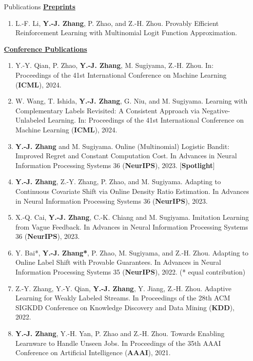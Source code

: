 \documentclass{resume} %
\begin{document}
\begin{rSection}{Publications}
\noindent \underline{\textbf{Preprints}}
\begin{enumerate}[leftmargin=*]
\item L.-F. Li, \textbf{Y.-J. Zhang}, P. Zhao, and Z.-H. Zhou. Provably Efficient Reinforcement Learning with Multinomial Logit Function Approximation. 
\end{enumerate}
\noindent \underline{\textbf{Conference Publications}}
\begin{enumerate}[leftmargin=*]
	\item Y.-Y. Qian, P. Zhao, \textbf{Y.-J. Zhang}, M. Sugiyama, Z.-H. Zhou. In: Proceedings of the 41st International Conference on Machine Learning (\textbf{ICML}), 2024.
	\item W. Wang, T. Ishida, \textbf{Y.-J. Zhang}, G. Niu, and M. Sugiyama. Learning with Complementary Labels Revisited: A Consistent Approach via Negative-Unlabeled Learning. In: Proceedings of the 41st International Conference on Machine Learning (\textbf{ICML}), 2024.		 
	\item \textbf{Y.-J. Zhang} and M. Sugiyama. Online (Multinomial) Logistic Bandit: Improved Regret and Constant Computation Cost. In {Advances in Neural Information Processing Systems 36} (\textbf{NeurIPS}), 2023. [\textbf{Spotlight}]
	\item \textbf{Y.-J. Zhang}, Z.-Y. Zhang, P. Zhao, and M. Sugiyama. Adapting to Continuous Covariate Shift via Online Density Ratio Estimation. In {Advances in Neural Information Processing Systems 36} (\textbf{NeurIPS}), 2023.
	\item X.-Q. Cai, \textbf{Y.-J. Zhang}, C.-K. Chiang and M. Sugiyama. Imitation Learning from Vague Feedback. In {Advances in Neural Information Processing Systems 36} (\textbf{NeurIPS}), 2023.
	\item Y. Bai*, \textbf{Y.-J. Zhang*}, P. Zhao, M. Sugiyama, and Z.-H. Zhou. Adapting to Online Label Shift with Provable Guarantees. In {Advances in Neural Information Processing Systems 35} (\textbf{NeurIPS}), 2022.  (* equal contribution)
	\item Z.-Y. Zhang, Y.-Y. Qian, \textbf{Y.-J. Zhang}, Y. Jiang, Z.-H. Zhou. Adaptive Learning for Weakly Labeled Streams. In {Proceedings of the 28th ACM SIGKDD Conference on Knowledge Discovery and Data Mining} (\textbf{KDD}), 2022.
	\item \textbf{Y.-J. Zhang}, Y.-H. Yan, P. Zhao and Z.-H. Zhou. Towards Enabling Learnware to Handle Unseen Jobs. In {Proceedings of the 35th AAAI Conference on Artificial Intelligence} (\textbf{AAAI}), 2021.

\end{enumerate}
\end{rSection}
\end{document}
